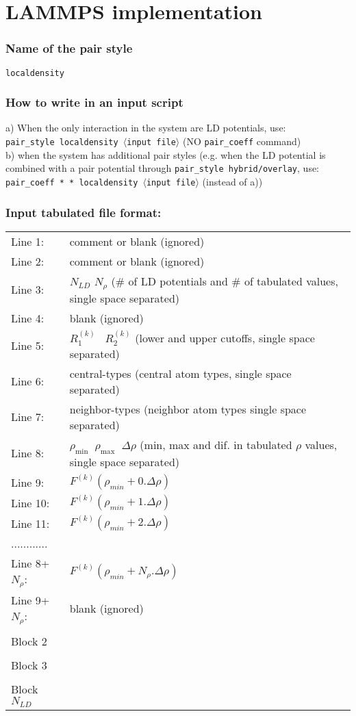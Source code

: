 \documentclass[12pt,a4paper]{article}
\begin{document}
\section*{LAMMPS implementation}
\subsubsection*{Name of the pair style}
\texttt{localdensity}
%
\subsubsection*{How to write in an input script}
a) When the only interaction in the system are LD potentials, use:\\
\texttt{pair\_style localdensity $\langle$input file$\rangle$} (NO \texttt{pair\_coeff} command)\\

\noindent b) when the system has additional pair styles (e.g. when the LD potential is combined with a pair potential through \texttt{pair\_style hybrid/overlay}, use:\\
\texttt{pair\_coeff *  * localdensity $\langle$input file$\rangle$} (instead of a))

\subsubsection*{Input tabulated file format:}
\begin{tabular}{l l}
Line 1:   & comment or blank (ignored)\\
Line 2:  & comment or blank (ignored)\\
Line 3:  & $N_{LD}$ $N_{\rho}$ (\# of LD potentials and \# of tabulated values, single space separated)\\
Line 4:  & blank (ignored)\\
Line 5:  & $R_1^{(k)} \; \; \; R_2^{(k)}$ (lower and upper cutoffs, single space separated)\\
Line 6: 	& central-types (central atom types, single space separated)\\
Line 7: 	& neighbor-types (neighbor atom types single space separated)\\
Line 8: 	& $\rho_{\mathrm{min}} \; \; \rho_{\mathrm{max}} \; \; \Delta \rho$ (min, max and dif. in tabulated $\rho$ values, single space separated)\\
Line 9: 	& $F^{(k)}(\rho_{min} + 0.\Delta \rho)$\\
Line 10:	& $F^{(k)}(\rho_{min} + 1.\Delta \rho)$\\
Line 11:	& $F^{(k)}(\rho_{min} + 2.\Delta \rho)$\\
............& { }\\
Line 8+$N_\rho$: &  $F^{(k)}(\rho_{min} + N_\rho . \Delta \rho)$\\	
Line 9+$N_\rho$: & blank (ignored)\\
\\
Block 2 & { }\\
\\
Block 3 & { }\\
\\
Block $N_{LD}$ & { }
\end{tabular}
\\
\end{document}
